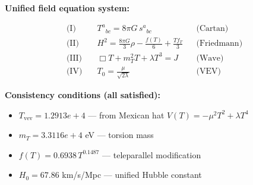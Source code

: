 
\textbf{Unified field equation system:}

\begin{align}
  \text{(I)} \quad & T^a{}_{bc} = 8\pi G \, s^a{}_{bc} && \text{(Cartan)} \\
  \text{(II)} \quad & H^2 = \frac{8\pi G}{3}\rho - \frac{f(T)}{6} + \frac{Tf_T}{3} && \text{(Friedmann)} \\
  \text{(III)} \quad & \Box T + m_T^2 T + \lambda T^3 = J && \text{(Wave)} \\
  \text{(IV)} \quad & T_0 = \frac{\mu}{\sqrt{2\lambda}} && \text{(VEV)}
\end{align}

\textbf{Consistency conditions (all satisfied):}
\begin{itemize}
  \item $T_{\text{vev}} = 1.2913e+4$ — from Mexican hat $V(T) = -\mu^2 T^2 + \lambda T^4$
  \item $m_T = 3.3116e+4$ eV — torsion mass
  \item $f(T) = 0.6938 \, T^{0.1487}$ — teleparallel modification
  \item $H_0 = 67.86$ km/s/Mpc — unified Hubble constant
\end{itemize}